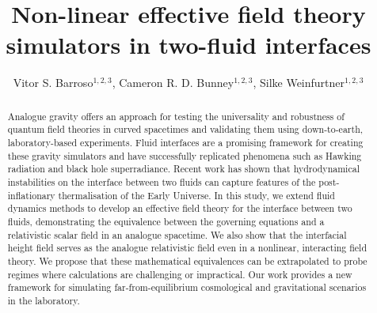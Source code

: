 \documentclass[a4paper]{jpconf}
\begin{document}
\title{Non-linear effective field theory simulators in two-fluid interfaces}

\author{Vitor S. Barroso$^{1,2,3}$, Cameron R. D. Bunney$^{1,2,3}$, Silke Weinfurtner$^{1,2,3}$}
\address{$^{1}$ School of Mathematical Sciences, University of Nottingham, University Park, Nottingham, NG7 2RD, UK}
\address{$^{2}$Centre for the Mathematics and Theoretical Physics of Quantum Non-Equilibrium Systems, University of Nottingham, Nottingham, NG7 2RD, UK}
\address{$^{3}$Nottingham Centre of Gravity, University of Nottingham, Nottingham, NG7 2RD, UK}





\begin{abstract}
Analogue gravity offers an approach for testing the universality and robustness of quantum field theories in curved spacetimes and validating them using down-to-earth, laboratory-based experiments. Fluid interfaces are a promising framework for creating these gravity simulators and have successfully replicated phenomena such as Hawking radiation and black hole superradiance. Recent work has shown that hydrodynamical instabilities on the interface between two fluids can capture features of the post-inflationary thermalisation of the Early Universe. In this study, we extend fluid dynamics methods to develop an effective field theory for the interface between two fluids, demonstrating the equivalence between the governing equations and a relativistic scalar field in an analogue spacetime. We also show that the interfacial height field serves as the analogue relativistic field even in a nonlinear, interacting field theory. We propose that these mathematical equivalences can be extrapolated to probe regimes where calculations are challenging or impractical.  Our work provides a new framework for simulating far-from-equilibrium cosmological and gravitational scenarios in the laboratory.
\end{abstract}
\end{document}
